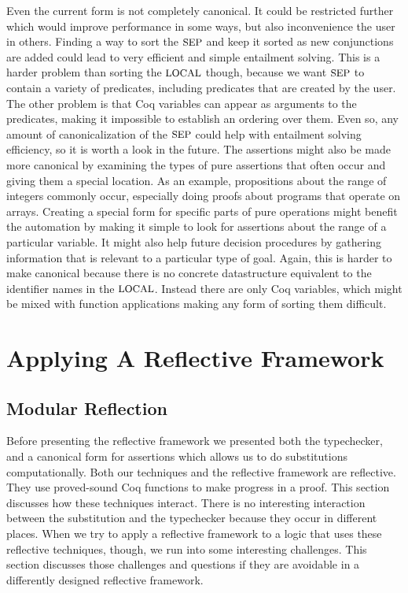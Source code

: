 \documentclass{puthesis}
\begin{document}
Even the current form is not completely canonical. It could be
restricted further which would improve performance in some ways, but
also inconvenience the user in others. Finding a way to sort the
$\mbox{\small SEP}$ and keep it sorted as new conjunctions are added could lead to
very efficient and simple entailment solving. This is a harder problem
than sorting the $\mbox{\small LOCAL}$ though, because we want $\mbox{\small SEP}$ to contain a
variety of predicates, including predicates that are created by the
user. The other problem is that Coq variables can appear as arguments
to the predicates, making it impossible to establish an ordering over
them. Even so, any amount of canonicalization of the $\mbox{\small SEP}$ could help
with entailment solving efficiency, so it is worth a look in the
future. The assertions might also be made more canonical by examining
the types of pure assertions that often occur and giving them a
special location. As an example, propositions about the range of
integers commonly occur, especially doing proofs about programs that
operate on arrays. Creating a special form for specific parts of pure
operations might benefit the automation by making it simple to look
for assertions about the range of a particular variable. It might also
help future decision procedures by gathering information that is
relevant to a particular type of goal. Again, this is harder to
make canonical because there is no concrete datastructure equivalent
to the identifier names in the $\mbox{\small LOCAL}$. Instead there are only Coq
variables, which might be mixed with function applications making any
form of sorting them difficult. 



\chapter{Applying A Reflective Framework}
\label{ch:reflection}

\section{Modular Reflection}

Before presenting the reflective framework we presented both the
typechecker, and a canonical form for assertions which allows us to do
substitutions computationally.  Both our techniques and the reflective
framework are reflective.  They use proved-sound Coq functions to make
progress in a proof. This section discusses how these techniques
interact. There is no interesting interaction between the substitution
and the typechecker because they occur in different places. When we
try to apply a reflective framework to a logic that uses these
reflective techniques, though, we run into some interesting
challenges. This section discusses those challenges and questions if
they are avoidable in a differently designed reflective framework.
\end{document}
